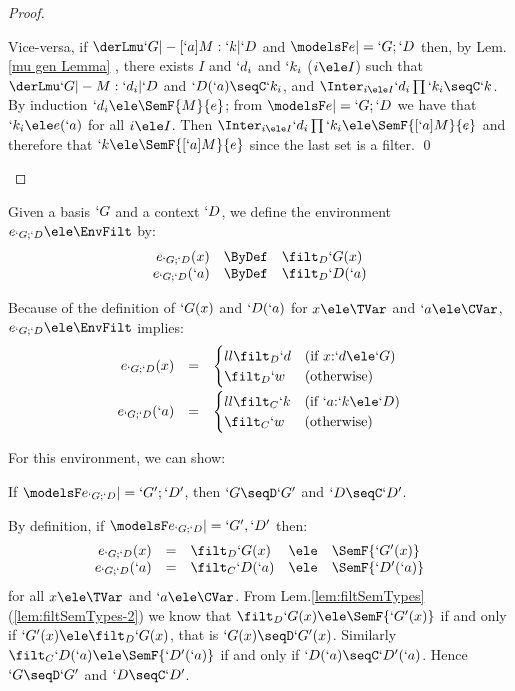 \documentclass{lmcs}
\begin{document}
\begin{proof}
\begin{description}
Vice-versa, if $ \derLmu `G |- [`a]M : `k | `D $ and $\modelsF e |= `G;`D $ then, by Lem.\skp\ref{mu gen Lemma}%
, there exists $I$ and $`d_i$ and $`k_i$ ($i \ele I$) such that $ \derLmu `G |- M : `d_i | `D $ and $`D(`a) \seqC `k_i $, and $\Inter_{i \ele I} `d_i\prod `k_i \seqC `k$.
By induction $`d_i \ele \SemF { M }{ e }$; from $\modelsF e |= `G;`D $ we have that $`k_i \ele e(`a)$ for all $i \ele I$.
Then $\Inter_{i \ele I}`d_i\prod `k_i \ele \SemF { [`a]M}{ e }$ and therefore that $`k \ele \SemF { [`a]M}{ e }$ since the last set is a filter.
\qed

 \end{description}
 \end{proof}


 \begin{defi} \label{def:e_GD }
Given a basis $`G$ and a context $`D $, we define the environment $e_{`G;`D } \ele \EnvFilt$ by: 
%
 \[ \begin{array}{rcl}
e_{`G;`D }(x) &\ByDef& \filt_D `G(x) \\
e_{`G;`D }(`a) &\ByDef& \filt_D `D(`a)
 \end{array} \]
 \end{defi}

Because of the definition of $`G(x)$ and $`D(`a)$ for $x\ele \TVar$ and $`a\ele \CVar$, $e_{`G;`D } \ele \EnvFilt$ implies:
%
 \[ \begin{array}{rcl}
e_{`G;`D }(x) &=& 
 \begin{cases}{ll}
	\filt_D `d & (\textrm{if }x{:}`d \ele `G) \\
	\filt_D `w & (\textrm{otherwise})
 \end{cases}
\\ [4mm]
e_{`G;`D }(`a) &=& 
 \begin{cases}{ll}
	\filt_C `k & (\textrm{if }`a{:}`k \ele `D) \\
	\filt_C `w & (\textrm{otherwise})
 \end{cases}
 \end{array} \]

For this environment, we can show:

 \begin{lem} \label{lem:EnvStrength}
If $ \modelsF e_{`G;`D } |= `G';`D' $, then $ `G\seqD`G' $ and $ `D\seqC`D'$.
 \end{lem}

 \begin{Proof}
By definition, if $\modelsF e_{`G;`D } |= `G',`D' $ then:
%
 \[ \begin{array}{rclcl}
e_{`G;`D }(x) &=& \filt_D `G(x) &\ele& \SemF { `G'(x) } \\
e_{`G;`D }(`a) &=& \filt_C `D(`a) &\ele& \SemF { `D'(`a) }
 \end{array} \] 
for all $x\ele \TVar$ and $`a\ele \CVar$.
From Lem.\skp\ref{lem:filtSemTypes}\,(\ref{lem:filtSemTypes-2}) we know that
$\filt_D `G(x) \ele \SemF { `G'(x) }$ if and only if $`G'(x) \ele \filt_D `G(x)$, that is $`G(x) \seqD `G'(x)$. 
Similarly $\filt_C `D(`a) \ele \SemF { `D'(`a) }$ if and only if $`D(`a)\seqC`D'(`a)$. Hence $`G\seqD`G'$ and $`D\seqC`D'$.
 \end{Proof}
\end{document}
